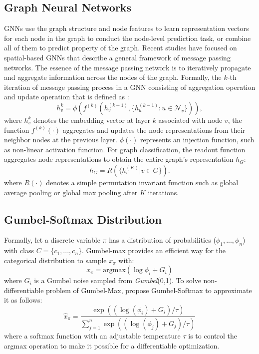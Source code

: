\documentclass[letterpaper]{article} %
\begin{document}
\subsection{Graph Neural Networks}
GNNs use the graph structure and node features to learn representation vectors for each node in the graph to conduct the node-level prediction task, or combine all of them to predict property of the graph. 
Recent studies have focused on spatial-based GNNs that describe a general framework of message passing networks. 
The essence of the message passing network is to iteratively propagate and aggregate information across the nodes of the graph. Formally, the $k$-th iteration of message passing process in a GNN consisting of aggregation operation and update operation that is defined as :
\begin{equation}
    h_v^{k} = \phi \left(f^{(k)}(h_v^{(k-1)}, \{ h_u^{(k-1)}: u \in \mathcal{N}_v \})\right),
\end{equation}
where $h^k_v$ denotes the embedding vector at layer $k$ associated with node $v$, the function $f^{(k)}(\cdot)$ aggregates and updates the node representations from their neighbor nodes at the previous layer. $\phi(\cdot)$ represents an injection function, such as non-linear activation function. 
For graph classification, the readout function aggregates node representations to obtain the entire graph's representation $h_G$:
\begin{equation}
    h_G = R(\{ h_v^{(K)} | v \in G \}).
\end{equation}
where $R(\cdot)$ denotes a simple permutation invariant function such as global average pooling or global max pooling after $K$ iterations. 

\subsection{Gumbel-Softmax Distribution}
Formally, let a discrete variable $\pi$ has a distribution of probabilities (\(\phi_1, ...,\phi_n\)) with class $C=\{c_1,...,c_n\}$.
Gumbel-max \cite{gumbel1954statistical} provides an efficient way for the categorical distribution to sample $x_\pi$ with:
\begin{equation}
x_{\pi}=\mathrm{argmax}(\log\phi_i + G_i)
\end{equation}
where $G_i$ is a Gumbel noise sampled from \textit{Gumbel}(0,1).
To solve non-differentiable problem of Gumbel-Max, \citet{jang2016categorical} propose Gumbel-Softmax to approximate it as follows:
\begin{equation}
\hat{x}_\pi=\frac{\exp((\log(\phi_i)+G_i)/\tau)}{\sum_{j=1}^{n}\exp((\log(\phi_j)+G_j)/\tau)}
\end{equation}
where a softmax function with an adjustable temperature $\tau$ is to control the argmax operation to make it possible for a differentiable optimization.
\end{document}
